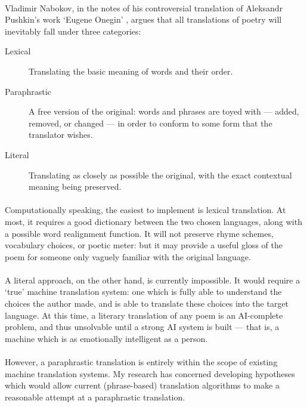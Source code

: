 \paragraph{}{Vladimir Nabokov, in the notes of his controversial
  translation of Aleksandr Pushkin's work `Eugene Onegin'
  \cite{nabokov}, argues that all translations of poetry will
  inevitably fall under three categories:}
\begin{description}
\item [Lexical] Translating the basic meaning of words and their
  order.
\item [Paraphrastic] A free version of the original: words and
  phrases are toyed with --- added, removed, or changed --- in order
  to conform to some form that the translator wishes.
\item [Literal] Translating as closely as possible the original, with
  the exact contextual meaning being preserved.
\end{description}

\paragraph{}{Computationally speaking, the easiest to implement is
  lexical translation. At most, it requires a good dictionary
  between the two chosen languages, along with a possible word
  realignment function. It will not preserve rhyme schemes,
  vocabulary choices, or poetic meter: but it may provide a useful
  gloss of the poem for someone only vaguely familiar with the
  original language.}
\paragraph{}{A literal approach, on the other hand, is
  currently impossible. It would require a `true' machine
  translation system: one which is fully able to understand the
  choices the author made, and is able to translate these choices
  into the target language. At this time, a literary translation of
  any poem is an AI-complete problem, and thus unsolvable until a
  strong AI system is built --- that is, a machine which is as
  emotionally intelligent as a person.}
\paragraph{}{However, a paraphrastic translation is entirely within
  the scope of existing machine translation systems. My research has
  concerned developing hypotheses which would allow current
  (phrase-based) translation algorithms to make a reasonable attempt
  at a paraphrastic translation. }
